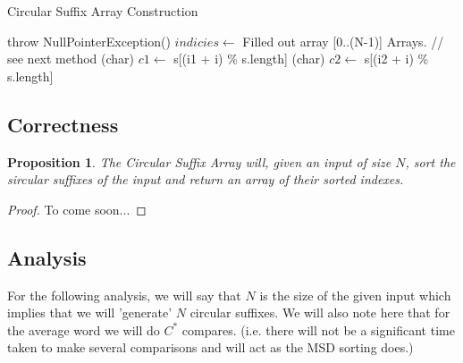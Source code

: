 \documentclass[12pt]{article}
\newtheorem{proposition}[theorem]{Proposition}
\begin{document}
\begin{algorithm}[H]
\caption{Circular Suffix Array Construction}
\begin{algorithmic}
            \State throw NullPointerException()
        \EndIf
        \State $indicies \gets$ Filled out array [0..(N-1)]
        \State Arrays. // see next method
    \EndProcedure
            \State (char) $c1 \gets$ s[(i1 + i) \% s.length]
            \State (char) $c2 \gets$ s[(i2 + i) \% s.length]
                \State {}
            \EndIf
            \State {}
        \EndFor
    \EndProcedure
\end{algorithmic}
\end{algorithm}



\subsection{Correctness}

\begin{proposition}
The Circular Suffix Array will, given an input of size $N$, sort the sircular suffixes
of the input and return an array of their sorted indexes.

\end{proposition}

\begin{proof}
To come soon...
\end{proof}

\subsection{Analysis}
For the following analysis, we will say that $N$ is the size of the given input which
implies that we will 'generate' $N$ circular suffixes. We will also note here that for
the average word we will do $C^{\ast}$ compares. (i.e. there will not be a significant
time taken to make several comparisons and will act as the MSD sorting does.)
\end{document}
